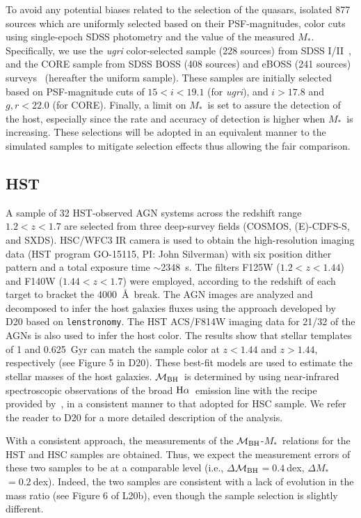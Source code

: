 \documentclass[twocolumn]{aastex631}
\def\smass{{$M_*$}}
\def\halpha{${\rm H}\alpha$}
\def\mbh{$\mathcal M_{\rm BH}$}
\begin{document}
To avoid any potential biases related to the selection of the quasars, \citet[][hereafter, L21b]{2021arXiv210902751L} isolated 877 sources which are uniformly selected based on their PSF-magnitudes, color cuts using single-epoch SDSS photometry and the value of the measured \smass. Specifically, we use the {\it ugri} color-selected sample (228 sources) from SDSS I/II~\citep{Richards2002}, and the CORE sample from SDSS BOSS (408 sources) and eBOSS (241 sources) surveys~\citep{Ross2013, Myers2015} (hereafter the uniform sample). These samples are initially selected based on PSF-magnitude cuts of $15 < i < 19.1$ (for {\it ugri}), and $i > 17.8$ and $g, r < 22.0$ (for CORE). Finally, a limit on \smass\ is set to assure the detection of the host, especially since the rate and accuracy of detection is higher when \smass\ is increasing. These selections will be adopted in an equivalent manner to the simulated samples to mitigate selection effects thus allowing the fair comparison.

\subsection{HST}

A sample of 32 HST-observed AGN systems across the redshift range $1.2<z<1.7$ are selected from three deep-survey fields (COSMOS, (E)-CDFS-S, and SXDS). HSC/WFC3 IR camera is used to obtain the high-resolution imaging data (HST program GO-15115, PI: John Silverman) with six position dither pattern and a total exposure time $\sim$2348~s. The filters F125W ($1.2<z<1.44$) and F140W ($1.44<z<1.7$) were employed, according to the redshift of each target to bracket the 4000~\AA~break.  The AGN images are analyzed and decomposed to infer the host galaxies fluxes using the approach developed by D20 based on {\tt lenstronomy}. The HST ACS/F814W imaging data for 21/32 of the AGNs is also used to infer the host color. The results show that stellar templates of 1 and 0.625~Gyr can match the sample color at $z<1.44$ and $z>1.44$, respectively (see Figure 5 in D20). These best-fit models are used to estimate the stellar masses of the host galaxies. \mbh\ is determined by \citet{Schulze2018} using near-infrared spectroscopic observations of the broad \halpha\ emission line with the recipe provided by~\citep{Vestergaard2006}, in a consistent manner to that adopted for HSC sample. We refer the reader to D20 for a more detailed description of the analysis. 

With a consistent approach, the measurements of the \mbh-\smass\ relations for the HST and HSC samples are obtained. Thus, we expect the measurement errors of these two samples to be at a comparable level (i.e., $\Delta$\mbh$=0.4~$dex, $\Delta$\smass$=0.2~$dex). 
Indeed, the two samples are consistent with a lack of evolution in the mass ratio (see Figure 6 of L20b), even though the sample selection is slightly different.
\end{document}
